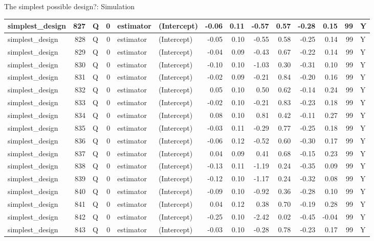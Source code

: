 \documentclass[
  11pt,
  ignorenonframetext,
]{beamer}
\begin{document}
\begin{frame}[fragile]{The simplest possible design?: Simulation}
\begin{tabular}{l|r|l|r|l|l|r|r|r|r|r|r|r|l}
\hline
simplest\_design & 827 & Q & 0 & estimator & (Intercept) & -0.06 & 0.11 & -0.57 & 0.57 & -0.28 & 0.15 & 99 & Y\\
\hline
simplest\_design & 828 & Q & 0 & estimator & (Intercept) & -0.05 & 0.10 & -0.55 & 0.58 & -0.25 & 0.14 & 99 & Y\\
\hline
simplest\_design & 829 & Q & 0 & estimator & (Intercept) & -0.04 & 0.09 & -0.43 & 0.67 & -0.22 & 0.14 & 99 & Y\\
\hline
simplest\_design & 830 & Q & 0 & estimator & (Intercept) & -0.10 & 0.10 & -1.03 & 0.30 & -0.31 & 0.10 & 99 & Y\\
\hline
simplest\_design & 831 & Q & 0 & estimator & (Intercept) & -0.02 & 0.09 & -0.21 & 0.84 & -0.20 & 0.16 & 99 & Y\\
\hline
simplest\_design & 832 & Q & 0 & estimator & (Intercept) & 0.05 & 0.10 & 0.50 & 0.62 & -0.14 & 0.24 & 99 & Y\\
\hline
simplest\_design & 833 & Q & 0 & estimator & (Intercept) & -0.02 & 0.10 & -0.21 & 0.83 & -0.23 & 0.18 & 99 & Y\\
\hline
simplest\_design & 834 & Q & 0 & estimator & (Intercept) & 0.08 & 0.10 & 0.81 & 0.42 & -0.11 & 0.27 & 99 & Y\\
\hline
simplest\_design & 835 & Q & 0 & estimator & (Intercept) & -0.03 & 0.11 & -0.29 & 0.77 & -0.25 & 0.18 & 99 & Y\\
\hline
simplest\_design & 836 & Q & 0 & estimator & (Intercept) & -0.06 & 0.12 & -0.52 & 0.60 & -0.30 & 0.17 & 99 & Y\\
\hline
simplest\_design & 837 & Q & 0 & estimator & (Intercept) & 0.04 & 0.09 & 0.41 & 0.68 & -0.15 & 0.23 & 99 & Y\\
\hline
simplest\_design & 838 & Q & 0 & estimator & (Intercept) & -0.13 & 0.11 & -1.19 & 0.24 & -0.35 & 0.09 & 99 & Y\\
\hline
simplest\_design & 839 & Q & 0 & estimator & (Intercept) & -0.12 & 0.10 & -1.17 & 0.24 & -0.32 & 0.08 & 99 & Y\\
\hline
simplest\_design & 840 & Q & 0 & estimator & (Intercept) & -0.09 & 0.10 & -0.92 & 0.36 & -0.28 & 0.10 & 99 & Y\\
\hline
simplest\_design & 841 & Q & 0 & estimator & (Intercept) & 0.04 & 0.12 & 0.38 & 0.70 & -0.19 & 0.28 & 99 & Y\\
\hline
simplest\_design & 842 & Q & 0 & estimator & (Intercept) & -0.25 & 0.10 & -2.42 & 0.02 & -0.45 & -0.04 & 99 & Y\\
\hline
simplest\_design & 843 & Q & 0 & estimator & (Intercept) & -0.03 & 0.10 & -0.28 & 0.78 & -0.23 & 0.17 & 99 & Y\\

\end{tabular}
\end{frame}
\end{document}
